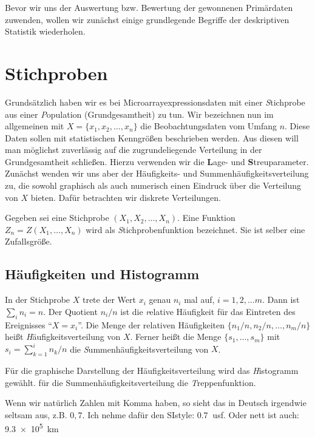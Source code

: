 Bevor wir uns der Auswertung bzw. Bewertung der gewonnenen Primärdaten zuwenden, wollen wir zunächst einige grundlegende Begriffe der deskriptiven Statistik wiederholen.
\section{Stichproben}

Grundsätzlich haben wir es bei Microarrayexpressionsdaten mit einer {\textit Stichprobe} aus einer {\textit Population (Grundgesamtheit)} zu tun.   
Wir bezeichnen nun im allgemeinen mit $X=\{x_1,x_2,\ldots,x_n\}$ die Beobachtungsdaten vom Umfang $n$. 
Diese Daten sollen mit statistischen Kenngrößen beschrieben werden. Aus diesen will man möglichst zuverlässig auf die zugrundeliegende Verteilung in der Grundgesamtheit schließen. Hierzu verwenden wir die {\textbf Lage-} und {\textbf Streuparameter}. Zunächst wenden wir uns aber der Häufigkeits- und Summenhäufigkeitsverteilung zu, die sowohl graphisch als auch numerisch einen Eindruck über die Verteilung von $X$ bieten. Dafür betrachten wir diskrete Verteilungen.

Gegeben sei eine Stichprobe $(X_1,X_2,\ldots,X_n)$. Eine Funktion $Z_n=Z(X_1,\ldots,X_n)$ wird als {\textit Stichprobenfunktion} bezeichnet. Sie ist selber eine Zufallsgröße.

\subsection{Häufigkeiten und Histogramm}
In der Stichprobe $X$ trete der Wert $x_i$ genau $n_i$ mal auf, $i=1,2,\ldots m$. Dann ist $\sum_i n_i = n$. Der Quotient $n_i/n$ ist die {\textit relative Häufigkeit} für das Eintreten des Ereignisses ``$X=x_i$''.
Die Menge der relativen Häufigkeiten $\{n_1/n,n_2/n,\ldots, n_m/n\}$ heißt {\textit Häufigkeitsverteilung} von $X$. Ferner heißt die Menge $\{s_1,\ldots,s_m\}$ mit $s_i=\sum_{k=1}^{i}n_k/n$ die {\textit Summenhäufigkeitsverteilung} von $X$.

Für die graphische Darstellung der Häufigkeitsverteilung wird das {\textit Histogramm} gewählt. für die Summenhäufigkeitsverteilung die {\textit Treppenfunktion}.

Wenn wir natürlich Zahlen mit Komma haben, so sieht das in Deutsch irgendwie seltsam aus, z.B. $0,7$. Ich nehme dafür den SIstyle: $\SI{0,7}{}$ usf.  Oder nett ist auch: \SI{9.3e5}{km}


